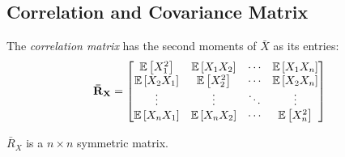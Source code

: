 \subsection{Correlation and Covariance Matrix}\label{subsec:Correlation and Correlation Matrix}
\begin{definition}
  The \emph{correlation matrix} has the second moments of $\bar{X}$ as its entries:
  \begin{equation}\label{eq:Correlation Matrix}
    \mathbf{\bar{R}_{X}}
    = \begin{bmatrix}
      \operatorname{\operatorname{\mathbb{E}}} \left[ X_{1}^{2} \right] & \operatorname{\operatorname{\mathbb{E}}} \left[ X_{1}X_{2} \right] & \cdots & \operatorname{\operatorname{\mathbb{E}}} \left[ X_{1}X_{n} \right] \\
      \operatorname{\operatorname{\mathbb{E}}} \left[ X_{2}X_{1} \right] & \operatorname{\operatorname{\mathbb{E}}} \left[ X_{2}^{2} \right] & \cdots & \operatorname{\operatorname{\mathbb{E}}} \left[ X_{2}X_{n} \right] \\
      \vdots & \vdots & \ddots & \vdots \\
      \operatorname{\operatorname{\mathbb{E}}} \left[ X_{n}X_{1} \right] & \operatorname{\operatorname{\mathbb{E}}} \left[ X_{n}X_{2} \right] & \cdots & \operatorname{\operatorname{\mathbb{E}}} \left[ X_{n}^{2} \right] \\
    \end{bmatrix} \\
  \end{equation}
  \begin{remark}
    $\bar{R}_{X}$ is a $n \times n$ symmetric matrix.
  \end{remark}
\end{definition}
